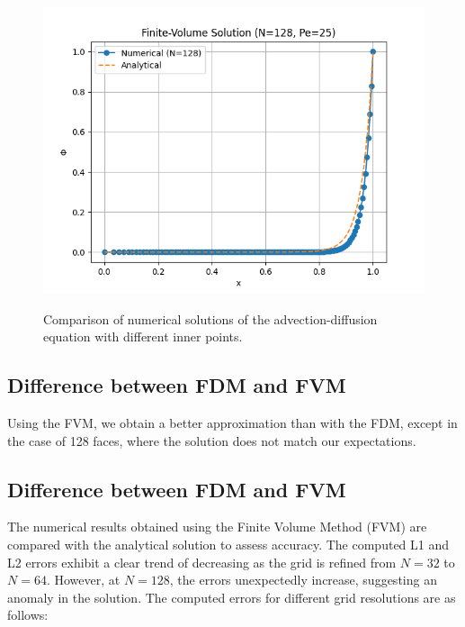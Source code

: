 \documentclass{article}
\begin{document}
\begin{figure}[H]
\begin{minipage}{0.32\textwidth}
      \includegraphics[width=\textwidth]{FVM_128.png}
      \label{fig:128}
  \end{minipage}
  \caption{Comparison of numerical solutions of the advection-diffusion equation with different inner points.}
  \label{fig:comparison}
\end{figure}

\subsection{Difference between FDM and FVM}

Using the FVM, we obtain a better approximation than with the FDM, except in the case of 128 faces, where the solution does not match our expectations. 

\subsection{Difference between FDM and FVM}

The numerical results obtained using the Finite Volume Method (FVM) are compared with the analytical solution to assess accuracy. The computed L1 and L2 errors exhibit a clear trend of decreasing as the grid is refined from $N = 32$ to $N = 64$. However, at $N = 128$, the errors unexpectedly increase, suggesting an anomaly in the solution. The computed errors for different grid resolutions are as follows:
\end{document}
